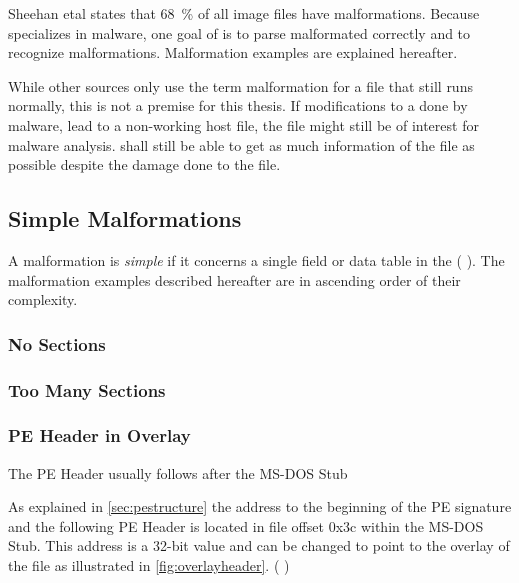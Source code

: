 Sheehan et\thinspace{}al states that 68~\% of all image files have malformations. \cite[slide 7]{sheehan07}
Because \portex{} specializes in \PE{} malware, one goal of \portex{} is to parse malformated  correctly and to recognize malformations.
Malformation examples are explained hereafter.

While other sources only use the term malformation for a file that still runs normally, this is not a premise for this thesis. If modifications to a \PE{} done by malware, lead to a non-working host file, the file might still be of interest for malware analysis. \portex{} shall still be able to get as much information of the file as possible despite the damage done to the file. 

\subsection{Simple Malformations}

A malformation is \emph{simple} if it concerns a single field or data table in the \PE{} (\cf{} \cite[slide 7]{vuksan11}).
The malformation examples described hereafter are in ascending order of their complexity. 

\subsubsection*{No Sections}

\subsubsection*{Too Many Sections}

\subsubsection*{PE Header in Overlay}

The PE Header usually follows after the MS-DOS Stub 

As explained in \autoref{sec:pestructure} the address to the beginning of the PE signature and the following PE Header is located in file offset 0x3c within the MS-DOS Stub. This address is a 32-bit value and can be changed to point to the overlay of the file as illustrated in \autoref{fig:overlayheader}. (\cf{} \cite[slide 13]{vuksan11})


